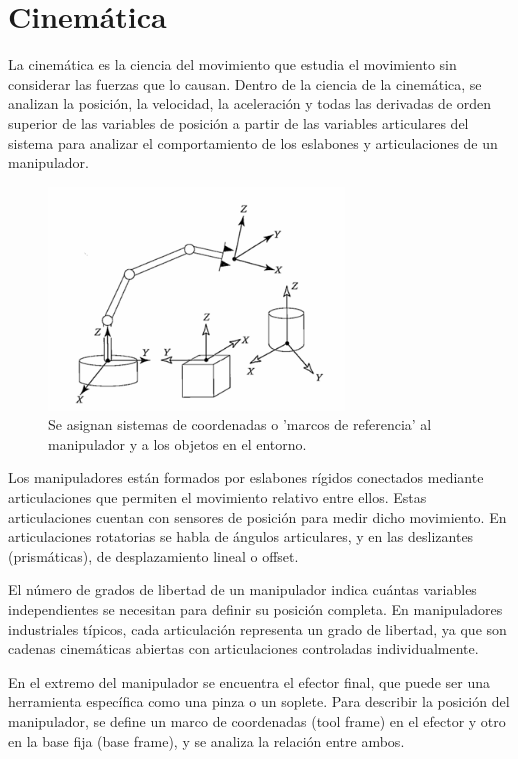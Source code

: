 \section{Cinemática} \label{sec:cinematica}

La cinemática es la ciencia del movimiento que estudia el movimiento sin considerar las fuerzas que lo causan. Dentro de la ciencia de la cinemática, se analizan la posición, la velocidad, la aceleración y todas las derivadas de orden superior de las variables de posición a partir de las variables articulares del sistema para analizar el comportamiento de los eslabones y articulaciones de un manipulador.
	\begin{figure}[H]
	\centering
	\includegraphics[width=0.7\textwidth]{img/Cinematica.png}
	\caption{Se asignan sistemas de coordenadas o 'marcos de referencia' al manipulador y a los objetos en el entorno.}
	\label{fig:Cinematica}
\end{figure}
Los manipuladores están formados por eslabones rígidos conectados mediante articulaciones que permiten el movimiento relativo entre ellos. Estas articulaciones cuentan con sensores de posición para medir dicho movimiento. En articulaciones rotatorias se habla de ángulos articulares, y en las deslizantes (prismáticas), de desplazamiento lineal o offset.

El número de grados de libertad de un manipulador indica cuántas variables independientes se necesitan para definir su posición completa. En manipuladores industriales típicos, cada articulación representa un grado de libertad, ya que son cadenas cinemáticas abiertas con articulaciones controladas individualmente.

En el extremo del manipulador se encuentra el efector final, que puede ser una herramienta específica como una pinza o un soplete. Para describir la posición del manipulador, se define un marco de coordenadas (tool frame) en el efector y otro en la base fija (base frame), y se analiza la relación entre ambos.


